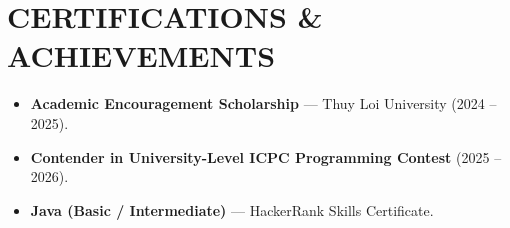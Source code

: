 ﻿\documentclass[10pt,a4paper]{article}
\begin{document}
\section*{CERTIFICATIONS \& ACHIEVEMENTS}
\begin{itemize}
    \item \textbf{Academic Encouragement Scholarship} --- Thuy Loi University (2024 -- 2025).
    \item \textbf{Contender in University-Level ICPC Programming Contest} (2025 -- 2026).
    \item \textbf{Java (Basic / Intermediate)} --- HackerRank Skills Certificate.
\end{itemize}
\end{document}
